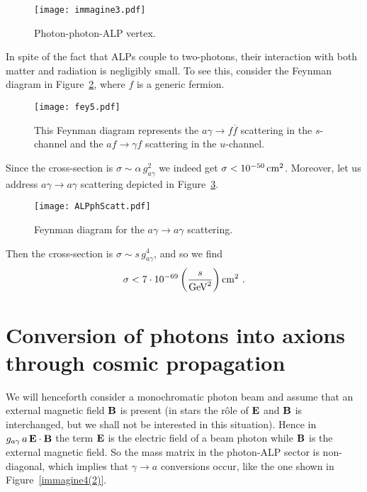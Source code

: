 \documentclass[aps,12pt,tightenlines,amsmath,amssymb]{revtex4}
\begin{document}
\begin{figure}[h]
\centering
\texttt{[image: immagine3.pdf]}
\caption{\label{immagine3(2)} Photon-photon-ALP vertex.}
\end{figure}



In spite of the fact that ALPs couple to two-photons, their interaction with both matter and radiation is negligibly small. To see 
this, consider the Feynman diagram in Figure~\ref{fey5}, where $f$ is a generic fermion.~ 
\begin{figure}[h]
\centering
\texttt{[image: fey5.pdf]}
\caption{\label{fey5} This Feynman diagram represents the $a \gamma \to f {\overline f}$ scattering in the $s$-channel and the $a f \to \gamma f$ scattering in the $u$-channel.}
\end{figure}
Since the cross-section is $\sigma \sim \alpha \, g^2_{a \gamma}$ we indeed get $\sigma < 10^{- 50} \, {\rm cm}^2$. Moreover, let us address $a \gamma \to a \gamma$ scattering depicted in Figure~\ref{ALPph}.~ 
\begin{figure}[h]
\centering
\texttt{[image: ALPphScatt.pdf]}
\caption{\label{ALPph} Feynman diagram for the $a \gamma \to a \gamma$ scattering.}
\end{figure}
Then the cross-section is $\sigma \sim s \, g^4_{a \gamma}$, and so we find 
\begin{equation}
\label{t1q}
\sigma < 7 \cdot 10^{- 69} \left(\frac{s}{{\rm GeV}^2} \right) {\rm cm}^2~.
\end{equation}


\section{Conversion of photons into axions through cosmic propagation}

We will henceforth consider a monochromatic photon beam and assume that an external magnetic field ${\bf B}$ is present (in stars the r\^ole of ${\bf E}$ and ${\bf B}$ is interchanged, but we shall not be interested in this situation). Hence in $g_{a \gamma} \, a \, {\bf E} \cdot {\bf B}$ the term ${\bf E}$ is the electric field of a beam photon while ${\bf B}$ is the external magnetic field. So the mass matrix in the photon-ALP sector is non-diagonal, which implies that $\gamma \to a$ conversions occur, like the one shown in Figure~\ref{immagine4(2)}.
\end{document}
